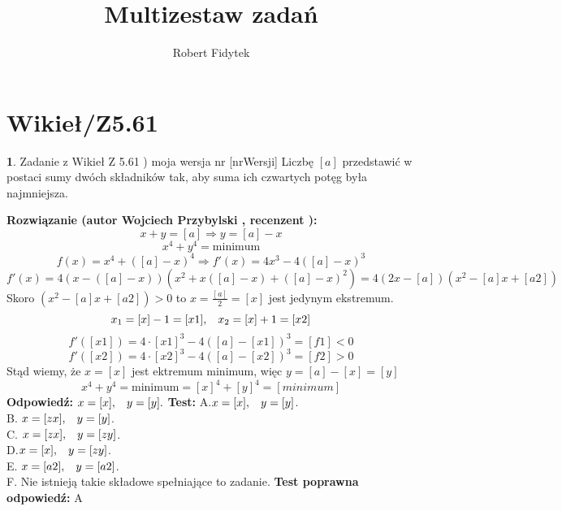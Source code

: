 \documentclass[12pt, a4paper]{article}
\title{Multizestaw zadań}
\author{Robert Fidytek}
\date{}
\theoremstyle{definition} %
\newtheorem{zad}{}
\newcommand{\kategoria}[1]{\section{#1}} %
\newcommand{\zadStart}[1]{\begin{zad}#1\newline} %
\newcommand{\zadStop}{\end{zad}}   %
\newcommand{\rozwStart}[2]{\noindent \textbf{Rozwiązanie (autor #1 , recenzent #2): }\newline} %
\newcommand{\rozwStop}{\newline}                                            %
\newcommand{\odpStart}{\noindent \textbf{Odpowiedź:}\newline}    %
\newcommand{\odpStop}{\newline}                                             %
\newcommand{\testStart}{\noindent \textbf{Test:}\newline} %
\newcommand{\testStop}{\newline} %
\newcommand{\kluczStart}{\noindent \textbf{Test poprawna odpowiedź:}\newline} %
\newcommand{\kluczStop}{\newline} %
\begin{document}
\maketitle


\kategoria{Wikieł/Z5.61}
\zadStart{Zadanie z Wikieł Z 5.61 ) moja wersja nr [nrWersji]}
Liczbę $[a]$ przedstawić w postaci sumy dwóch składników tak, aby suma ich czwartych potęg była najmniejsza.
\zadStop
\rozwStart{Wojciech Przybylski}{}
$$x+y=[a] \Rightarrow y=[a]-x$$
$$x^{4}+y^{4}=\mbox{minimum}$$
$$f(x)=x^{4}+([a]-x)^{4} \Rightarrow f'(x)=4x^{3}-4([a]-x)^{3}$$
$$f'(x)=4(x-([a]-x))(x^{2}+x([a]-x)+([a]-x)^{2})=4(2x-[a])(x^{2}-[a]x+[a2])$$
Skoro $(x^{2}-[a]x+[a2])>0$ to $x=\frac{[a]}{2}=[x]$ jest jedynym ekstremum.
$$x_{1}=[x]-1=[x1], \hspace{3mm} x_{2}=[x]+1=[x2]$$
$$f'([x1])=4\cdot[x1]^{3}-4([a]-[x1])^{3}=[f1]<0$$
$$f'([x2])=4\cdot[x2]^{3}-4([a]-[x2])^{3}=[f2]>0$$
Stąd wiemy, że $x=[x]$ jest ektremum minimum, więc $y=[a]-[x]=[y]$
$$x^{4}+y^{4}=\mbox{minimum}=[x]^{4}+[y]^{4}=[minimum]$$
\rozwStop
\odpStart
$x=[x], \hspace{3mm} y=[y].$
\odpStop
\testStart
A.$x=[x], \hspace{3mm} y=[y]$.\\
B. $x=[zx], \hspace{3mm} y=[y]$.\\
C. $x=[zx], \hspace{3mm} y=[zy]$.\\
D.$x=[x], \hspace{3mm} y=[zy]$.\\
E. $x=[a2], \hspace{3mm} y=[a2]$.\\
F. Nie istnieją takie składowe spełniające to zadanie.
\testStop
\kluczStart
A
\kluczStop
\end{document}
